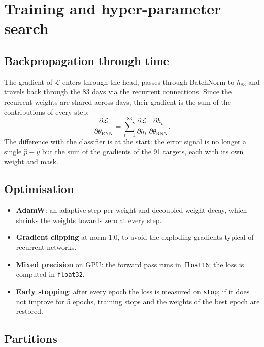 \documentclass[11pt]{article}
\newcommand{\code}[1]{\texttt{#1}}
\begin{document}
\section{Training and hyper-parameter search}

\subsection{Backpropagation through time}

The gradient of $\mathcal L$ enters through the head, passes through BatchNorm to $h_{83}$ and travels back through the 83 days via the recurrent connections. Since the recurrent weights are shared across days, their gradient is the sum of the contributions of every step:
\begin{equation}
\frac{\partial \mathcal L}{\partial \theta_{\text{RNN}}} = \sum_{t=1}^{83} \frac{\partial \mathcal L}{\partial h_t}\,\frac{\partial h_t}{\partial \theta_{\text{RNN}}} .
\end{equation}
The difference with the classifier is at the start: the error signal is no longer a single $\hat p - y$ but the sum of the gradients of the 91 targets, each with its own weight and mask.

\subsection{Optimisation}

\begin{itemize}
  \item \textbf{AdamW}: an adaptive step per weight and decoupled weight decay, which shrinks the weights towards zero at every step.
  \item \textbf{Gradient clipping} at norm 1.0, to avoid the exploding gradients typical of recurrent networks.
  \item \textbf{Mixed precision} on GPU: the forward pass runs in \code{float16}; the loss is computed in \code{float32}.
  \item \textbf{Early stopping}: after every epoch the loss is measured on \code{stop}; if it does not improve for 5 epochs, training stops and the weights of the best epoch are restored.
\end{itemize}

\subsection{Partitions}
\end{document}
